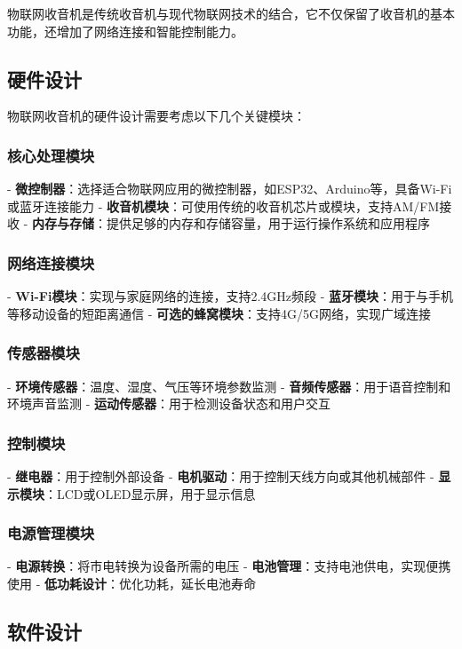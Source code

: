 \documentclass[12pt,UTF8]{ctexbook}
\begin{document}
物联网收音机是传统收音机与现代物联网技术的结合，它不仅保留了收音机的基本功能，还增加了网络连接和智能控制能力。

\subsection{硬件设计}

物联网收音机的硬件设计需要考虑以下几个关键模块：

\subsubsection{核心处理模块}
- \textbf{微控制器}：选择适合物联网应用的微控制器，如ESP32、Arduino等，具备Wi-Fi或蓝牙连接能力
- \textbf{收音机模块}：可使用传统的收音机芯片或模块，支持AM/FM接收
- \textbf{内存与存储}：提供足够的内存和存储容量，用于运行操作系统和应用程序

\subsubsection{网络连接模块}
- \textbf{Wi-Fi模块}：实现与家庭网络的连接，支持2.4GHz频段
- \textbf{蓝牙模块}：用于与手机等移动设备的短距离通信
- \textbf{可选的蜂窝模块}：支持4G/5G网络，实现广域连接

\subsubsection{传感器模块}
- \textbf{环境传感器}：温度、湿度、气压等环境参数监测
- \textbf{音频传感器}：用于语音控制和环境声音监测
- \textbf{运动传感器}：用于检测设备状态和用户交互

\subsubsection{控制模块}
- \textbf{继电器}：用于控制外部设备
- \textbf{电机驱动}：用于控制天线方向或其他机械部件
- \textbf{显示模块}：LCD或OLED显示屏，用于显示信息

\subsubsection{电源管理模块}
- \textbf{电源转换}：将市电转换为设备所需的电压
- \textbf{电池管理}：支持电池供电，实现便携使用
- \textbf{低功耗设计}：优化功耗，延长电池寿命

\subsection{软件设计}
\end{document}
